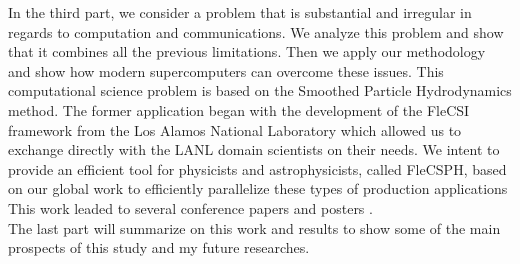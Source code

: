 In the third part, we consider a problem that is substantial and irregular in regards to computation and communications.
We analyze this problem and show that it combines all the previous limitations. 
Then we apply our methodology and show how modern supercomputers can overcome these issues. 
This computational science problem is based on the Smoothed Particle Hydrodynamics method.
The former application began with the development of the FleCSI framework from the Los Alamos National Laboratory which allowed us to exchange directly with the LANL domain scientists on their needs.
We intent to provide an efficient tool for physicists and astrophysicists, called FleCSPH, based on our global work to efficiently parallelize these types of production applications
This work leaded to several conference papers \cite{loiseau2018Flecsphg,loiseau2018CARLA} and posters \cite{debrye20162HOT,loiseau2017SC}.\\

The last part will summarize on this work and results to show some of the main prospects of this study and my future researches.
